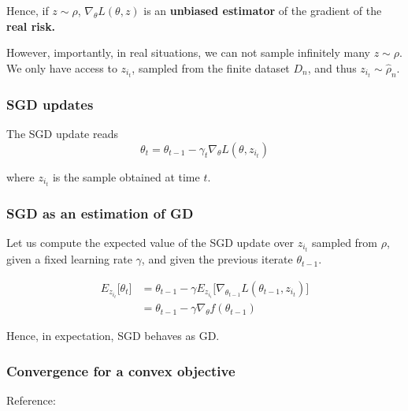 \documentclass[
10pt, %
a4paper, %
oneside, %
headinclude,footinclude, %
BCOR5mm, %
]{scrartcl}
\begin{document}
Hence, if $z\sim \rho$, $\nabla_{\theta}L(\theta, z)$ is an \textbf{{unbiased estimator}} of the gradient of the \textbf{{real risk.}} 

However, importantly, in real situations, we can not sample infinitely many $z\sim \rho$. We only have access to $z_{i_t}$, sampled from the finite dataset $D_n$, and thus $z_{i_t}\sim \hat{\rho}_n$.

\subsubsection{\large\color{Periwinkle}SGD updates}

The SGD update reads
\begin{equation*}
    \theta_t = \theta_{t-1}-\gamma_t \nabla_{\theta} L(\theta, z_{i_t})
\end{equation*}

where $z_{i_t}$ is the sample obtained at time $t$.

\subsubsection{\large\color{Periwinkle}SGD as an estimation of GD}

Let us compute the expected value of the SGD update over $z_{i_t}$ sampled from $\rho$, given a fixed learning rate $\gamma$, and given the previous iterate $ \theta_{t-1}$.

\begin{equation*}
    \begin{aligned}
	E_{z_{i_t}}\big[\theta_t\big] &= \theta_{t-1} - \gamma E_{z_{i_i}}\big[\nabla_{\theta_{t-1}} L(\theta_{t-1}, z_{i_t})\big]\\
	&= \theta_{t-1} - \gamma \nabla_{\theta} f(\theta_{t-1})
    \end{aligned}
\end{equation*}

Hence, in expectation, SGD behaves as GD.


\subsubsection{\large\color{Periwinkle}Convergence for a convex objective}

Reference: \cite{Bach2021} 
\end{document}
